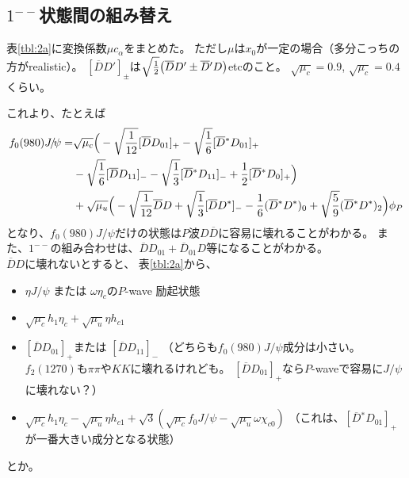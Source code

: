 \documentclass[a4j]{jarticle}
\def\Jpsi{{J\!/\!\psi}{}}
\def\Dbar{\overline{{D}}{}}
\begin{document}
\subsection{$1^{--}$状態間の組み替え}

表\ref{tbl:2a}に変換係数$\mu c_\alpha$をまとめた。
ただし$\mu$は$x_0$が一定の場合（多分こっちの方がrealistic）。
$[\Dbar D']_\pm$は$\sqrt{1\over 2}\big(\Dbar D'\pm\Dbar' D  \big)$etcのこと。
$\sqrt{\mu_c}=0.9$, 
$\sqrt{\mu_c}=0.4$くらい。 

これより、たとえば
\begin{align}
f_0(980)\Jpsi =& \sqrt{\mu_c}\Big(
-\sqrt{1\over 12}[\Dbar   D_{01}]_+
-\sqrt{1\over 6}[\Dbar^* D_{01}]_+
\nonumber\\
&-\sqrt{1\over 6}[\Dbar   D_{11}]_-
-\sqrt{1\over 3}[\Dbar^* D_{11}]_-
+{1\over 2}[\Dbar^* D_{0}]_+ \Big)
\nonumber\\
&+ \sqrt{\mu_u}\Big(-\sqrt{1\over 12}\Dbar   D
+\sqrt{1\over 3}[\Dbar   D^*]_-
-{1\over 6}(\Dbar^* D^*)_0
+\sqrt{5\over 9}(\Dbar^* D^*)_2\Big)\phi_P
\end{align}
となり、$f_0(980)\Jpsi$だけの状態は$P$波$D\Dbar$に容易に壊れることがわかる。
また、$1^{--}$の組み合わせは、$\Dbar   D_{01}+\Dbar_{01} D$等になることがわかる。
\\

$\Dbar D$に壊れないとすると、
表\ref{tbl:2a}から、
\begin{itemize}
\item $\eta\Jpsi$ または $\omega \eta_c$の$P$-wave 励起状態

\item
$\sqrt{\mu_c}h_1\eta_c + \sqrt{\mu_u}\eta  h_{c1}$

\item
$[\Dbar   D_{01}]_+$または
$[\Dbar   D_{11}]_-$
（どちらも$f_0(980)\Jpsi$成分は小さい。$f_2(1270)$も$\pi\pi$や$KK$に壊れるけれども。
$[\Dbar   D_{01}]_+$なら$P$-waveで容易に$\Jpsi$に壊れない？）
\item
$\sqrt{\mu_c}h_1\eta_c - \sqrt{\mu_u}\eta h_{c1} +\sqrt{3}(\sqrt{\mu_c}f_0\Jpsi-\sqrt{\mu_u}\omega\chi_{c0})$
（これは、$[\Dbar^* D_{01}]_+$が一番大きい成分となる状態）

\end{itemize}
とか。
\end{document}
